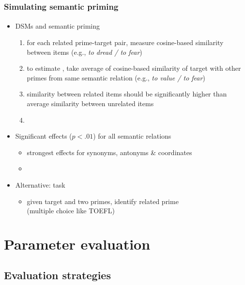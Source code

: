 \documentclass[t]{beamer} %
\begin{document}
\begin{frame}
  \frametitle{Simulating semantic priming}
  \framesubtitle{\citet{McDonald:Brew:04,Pado:Lapata:07}}
 \begin{itemize}
 \item DSMs and semantic priming
  \begin{enumerate}
  \item for each related prime-target pair, 
  measure cosine-based similarity between items (e.g.,
    \emph{to dread / to fear})
    \pause
  \item to estimate , take average of cosine-based similarity of target with other primes from same semantic relation (e.g., \emph{to value / to fear})
    \pause
  \item similarity between related items should be significantly higher
    than average similarity between unrelated items
    \item[]
  \end{enumerate}
\item<2-> Significant effects ($p < .01$) for all semantic relations 
  \begin{itemize}
  \item strongest effects for synonyms, antonyms \& coordinates
  \item[]
  \end{itemize}
\item<3-> Alternative:  task
  \begin{itemize}
  \item given target and two primes, identify related prime\\ (\so multiple choice like TOEFL)
  \end{itemize}
  \end{itemize}
\end{frame}


\section{Parameter evaluation}

\subsection{Evaluation strategies}
\end{document}
